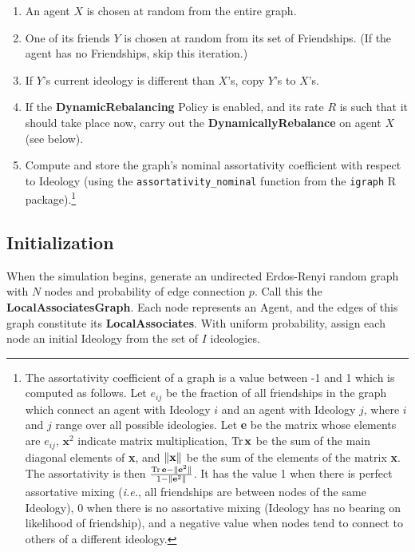 \begin{enumerate}
\itemsep.1em
\item An agent $X$ is chosen at random from the entire graph.
\item One of its friends $Y$ is chosen at random from its set of Friendships.
(If the agent has no Friendships, skip this iteration.)
\item If $Y$'s current ideology is different than $X$'s, copy $Y$'s to $X$'s.
\item If the \textbf{DynamicRebalancing} Policy is enabled, and its rate $R$
is such that it should take place now, carry out the
\textbf{DynamicallyRebalance} on agent $X$ (see below).
 
\item Compute and store the graph's nominal assortativity coefficient with
respect to Ideology (using the \texttt{assortativity\_nominal} function from
the \texttt{igraph} R package\cite{csardi_igraph_2006}).\footnote{The
assortativity coefficient of a graph is a value between -1 and 1 which is
computed as follows. Let $e_{ij}$ be the fraction of all friendships in the
graph which connect an agent with Ideology $i$ and an agent with Ideology $j$,
where $i$ and $j$ range over all possible ideologies. Let \textbf{e} be the
matrix whose elements are $e_{ij}$, $\textbf{x}^2$ indicate matrix
multiplication, $\operatorname{Tr} \textbf{x}$ be the sum of the main diagonal elements of
\textbf{x}, and $\lVert\textbf{x}\rVert$ be the sum of the elements of the matrix
\textbf{x}. The assortativity is then $\frac{\operatorname{Tr} \textbf{e} -
\lVert\textbf{e}^2\rVert}{1 - \lVert\textbf{e}^2\rVert}$. It has the value 1 when there
is perfect assortative mixing (\textit{i.e.}, all friendships are between
nodes of the same Ideology), 0 when there is no assortative mixing (Ideology
has no bearing on likelihood of friendship), and a negative value when nodes
tend to connect to others of a different ideology.}

\end{enumerate}


\subsection{Initialization}
\label{sec:initialization}

When the simulation begins, generate an undirected Erdos-Renyi random
graph\cite{erdos_evolution_1960} with $N$ nodes and probability of edge
connection $p$. Call this the \textbf{LocalAssociatesGraph}. Each node
represents an Agent, and the edges of this graph constitute its
\textbf{LocalAssociates}. With uniform probability, assign each node an
initial Ideology from the set of $I$ ideologies.

